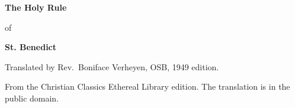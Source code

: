 \documentclass[11pt,letterpaper]{article}
\begin{document}
\color{ink}

\begin{titlepage}
\centering
\vspace*{4em}
{\LARGE\bfseries\color{heading} The Holy Rule\par}
\vspace{1em}
{\large of\par}
\vspace{1em}
{\LARGE\bfseries\color{heading} St. Benedict\par}
\vspace{3em}
{Translated by Rev.\ Boniface Verheyen, OSB, 1949 edition.\par}
\vfill
{\small From the Christian Classics Ethereal Library edition. The
translation is in the public domain.\par}
\vspace{2em}
\end{titlepage}

\tableofcontents
\clearpage


\end{document}
